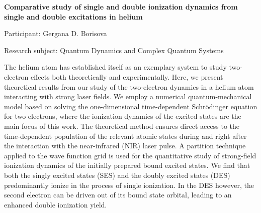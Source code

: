 \begin{minipage}[t]{1.0\textwidth}

\begin{center}

{{\large\bfseries Comparative study of single and double ionization dynamics from single and double excitations in helium}\par}

\end{center}

{\noindent Participant: Gergana D. Borisova\par} 

{\noindent Research subject: Quantum Dynamics and Complex Quantum Systems\par}\medskip

\noindent The helium atom has established itself as an exemplary system to study two-electron effects both theoretically and experimentally. Here, we present theoretical results from our study of the two-electron dynamics in a helium atom interacting with strong laser fields. We employ a numerical quantum-mechanical model based on solving the one-dimensional time-dependent Schrödinger equation for two electrons, where the ionization dynamics of the excited states are the main focus of this work. The theoretical method ensures direct access to the time-dependent population of the relevant atomic states during and right after the interaction with the near-infrared (NIR) laser pulse. A partition technique applied to the wave function grid is used for the quantitative study of strong-field ionization dynamics of the initially prepared bound excited states. We find that both the singly excited states (SES) and the doubly excited states (DES) predominantly ionize in the process of single ionization. In the DES however, the second electron can be driven out of its bound state orbital, leading to an enhanced double ionization yield.\par\end{minipage}

\hfill 

